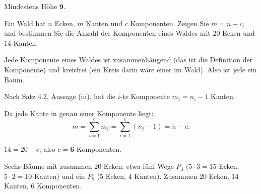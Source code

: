 \begin{aufgabe}
Mindestens Höhe $\mathbf{9}$.

\begin{center}
\begin{minipage}{0.86\textwidth}
\end{minipage}
\end{center}
\end{aufgabe}

\begin{aufgabe}
Ein Wald hat $n$ Ecken, $m$ Kanten und $c$ Komponenten. Zeigen Sie $m = n - c$, und bestimmen Sie die Anzahl der Komponenten eines Waldes mit $20$ Ecken und $14$ Kanten.

\loesung
{}
Jede Komponente eines Waldes ist zusammenhängend (das ist die Definition der Komponente) und kreisfrei (ein Kreis darin wäre einer im Wald). Also ist jede ein Baum.

Nach Satz 4.2, Aussage (iii), hat die $i$-te Komponente $m_i = n_i - 1$ Kanten.

Da jede Kante in genau einer Komponente liegt:
\[ m = \sum_{i=1}^{c} m_i = \sum_{i=1}^{c}(n_i - 1) = n - c . \]

$14 = 20 - c$, also $c = \mathbf{6}$ Komponenten.

Sechs Bäume mit zusammen $20$ Ecken: etwa fünf Wege $P_3$ ($5 \cdot 3 = 15$ Ecken, $5 \cdot 2 = 10$ Kanten) und ein $P_5$ ($5$ Ecken, $4$ Kanten). Zusammen $20$ Ecken, $14$ Kanten, $6$ Komponenten. \checkmark
\end{aufgabe}

